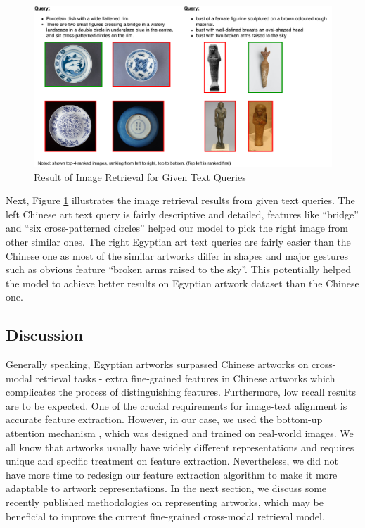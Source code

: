 \begin{figure}[h!]
\centering
\includegraphics[width=\textwidth]{t2i.pdf}
\caption{Result of Image Retrieval for Given Text Queries
}
\label{fig:t2i}
\end{figure}

Next, Figure \ref{fig:t2i} illustrates the image retrieval results from given text queries. The left Chinese art text query is fairly descriptive and detailed, features like ``bridge'' and ``six cross-patterned circles'' helped our model to pick the right image from other similar ones. The right Egyptian art text queries are fairly easier than the Chinese one as most of the similar artworks differ in shapes and major gestures such as obvious feature ``broken arms raised to the sky''. This potentially helped the model to achieve better results on Egyptian artwork dataset than the Chinese one.

\subsection{Discussion}

Generally speaking, Egyptian artworks surpassed Chinese artworks on cross-modal retrieval tasks - extra fine-grained features in Chinese artworks which complicates the process of distinguishing features. Furthermore, low recall results are to be expected. One of the crucial requirements for image-text alignment is accurate feature extraction. However, in our case, we used the bottom-up attention mechanism \cite{bottomup}, which was designed and trained on real-world images. We all know that artworks usually have widely different representations and requires unique and specific treatment on feature extraction. Nevertheless, we did not have more time to redesign our feature extraction algorithm to make it more adaptable to artwork representations. In the next section, we discuss some recently published methodologies on representing artworks, which may be beneficial to improve the current fine-grained cross-modal retrieval model. 

